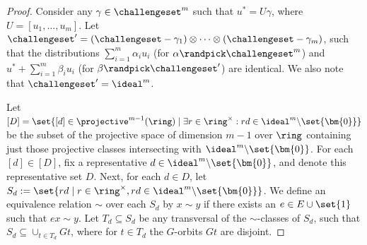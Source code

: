 \begin{proof}
Consider any $\gamma \in \challengeset^m$ such that $u^\ast = U \gamma$, where $U = [u_1,\dotsc,u_m]$. Let $\challengeset' = (\challengeset - \gamma_1) \otimes \dotsm \otimes (\challengeset - \gamma_m)$, such that the distributions $\sum_{i=1}^{m} \alpha_i u_i$ (for $\alpha \randpick \challengeset^m$) and $u^\ast + \sum_{i=1}^{m} \beta_i u_i$ (for $\beta \randpick \challengeset'$) are identical. We also note that $\challengeset' = \ideal^m$.

Let $[D] = \set{[d] \in \projective^{m-1}(\ring) \mid \exists r \in \ring^\times: rd \in \ideal^{m}{\setminus}\set{\bm{0}}}$ be the subset of the projective space of dimension $m-1$ over $\ring$ containing just those projective classes intersecting with $\ideal^{m}{\setminus}\set{\bm{0}}$. For each $[d] \in [D]$, fix a representative $d \in \ideal^{m}{\setminus}\set{\bm{0}}$, and denote this representative set $D$. Next, for each $d \in D$, let $S_{d} := \set{rd \mid r \in \ring^\times, rd \in \ideal^{m}{\setminus}\set{\bm{0}}}$. We define an equivalence relation $\sim$ over each $S_{d}$ by $x \sim y$ if there exists an $e \in E \cup \set{1}$ such that $ex \sim y$.  Let $T_d \subseteq S_d$ be any transversal of the $\sim$-classes of $S_d$, such that $S_d \subseteq \cup_{t \in T_d} Gt$, where for $t \in T_d$ the $G$-orbits $Gt$ are disjoint.


\end{proof}
